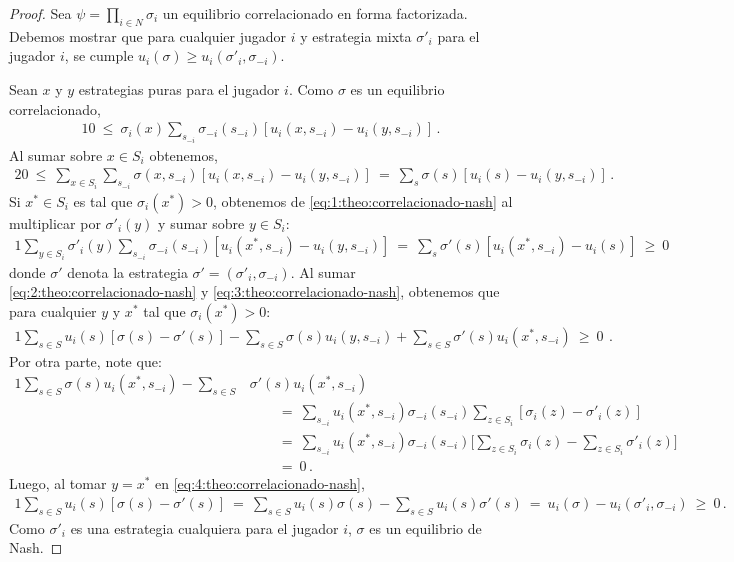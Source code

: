 \begin{proof}
Sea $\psi= \prod_{i \in N} \sigma_i$ un equilibrio correlacionado en forma factorizada. Debemos mostrar que para cualquier jugador $i$ y estrategia mixta $\sigma'_i$ para el jugador $i$, se cumple $u_i(\sigma) \geq u_i(\sigma'_i, \sigma_{-i})$.

Sean $x$ y $y$ estrategias puras para el jugador $i$.
Como $\sigma$ es un equilibrio correlacionado,
\begin{alignat}{1}
\label{eq:1:theo:correlacionado-nash}
0\ \leq\ %
\sigma_i(x) \sum_{s_{-i}} \sigma_{-i}(s_{-i})[u_i(x, s_{-i}) - u_i(y, s_{-i})] \,.
\end{alignat}
Al sumar sobre $x\in S_i$ obtenemos, 
\begin{alignat}{2}
\label{eq:2:theo:correlacionado-nash}
0\ \leq\ \sum_{x\in S_i} \sum_{s_{-i}} \sigma(x,s_{-i}) [u_i(x, s_{-i}) - u_i(y, s_{-i})]\ =\ \sum_s \sigma(s) [u_i(s) - u_i(y, s_{-i})] \,.
\end{alignat}
Si $x^* \in S_i$ es tal que $\sigma_i(x^*)>0$, obtenemos de \eqref{eq:1:theo:correlacionado-nash} al multiplicar por $\sigma'_i(y)$ y sumar sobre $y\in S_i$:
\begin{alignat}{1}
\label{eq:3:theo:correlacionado-nash}
\sum_{y \in S_i} \sigma'_i(y) \sum_{s_{-i}} \sigma_{-i} (s_{-i}) [u_i(x^*, s_{-i}) - u_i(y, s_{-i})]\ =\ \sum_{s} \sigma'(s) [u_i(x^*, s_{-i}) - u_i(s)]\ \geq\ 0
\end{alignat}
donde $\sigma'$ denota la estrategia $\sigma'=(\sigma'_i,\sigma_{-i})$. 
Al sumar \eqref{eq:2:theo:correlacionado-nash} y
\eqref{eq:3:theo:correlacionado-nash}, obtenemos que para cualquier $y$ y $x^*$ tal que $\sigma_i(x^*)>0$:
\begin{alignat}{1}
\label{eq:4:theo:correlacionado-nash}
\sum_{s \in S} u_i(s) [\sigma(s) - \sigma'(s)] - \sum_{s \in S} \sigma(s)u_i(y, s_{-i}) + \sum_{s \in S} \sigma'(s) u_i(x^*, s_{-i})\ \geq\ 0\ \,.
\end{alignat}
Por otra parte, note que:
\begin{alignat}{1}
  \sum_{s \in S} \sigma(s) u_i(x^*,s_{-i}) - \sum_{s \in S} &\sigma'(s) u_i(x^*,s_{-i}) \\
    &\qquad=\ \sum_{s_{-i}} u_i(x^*,s_{-i}) \sigma_{-i}(s_{-i}) \sum_{z\in S_i} [\sigma_i(z) - \sigma'_i(z)] \\
    &\qquad=\ \sum_{s_{-i}} u_i(x^*,s_{-i}) \sigma_{-i}(s_{-i}) \biggl[ \sum_{z\in S_i} \sigma_i(z) - \sum_{z\in S_i} \sigma'_i(z) \biggr] \\
    &\qquad=\ 0 \,.
\end{alignat}
Luego, al tomar $y=x^*$ en \eqref{eq:4:theo:correlacionado-nash},
\begin{alignat}{1}
 \sum_{s \in S} u_i(s) [\sigma(s) - \sigma'(s)]\ =\ \sum_{s \in S} u_i(s)\sigma(s) - \sum_{s \in S} u_i(s)\sigma'(s)\ =\ u_i(\sigma) - u_i(\sigma'_i, \sigma_{-i})\ \geq\ 0 \,.
\end{alignat}
Como $\sigma'_i$ es una estrategia cualquiera para el jugador $i$, $\sigma$ es un equilibrio de Nash.
\end{proof}

